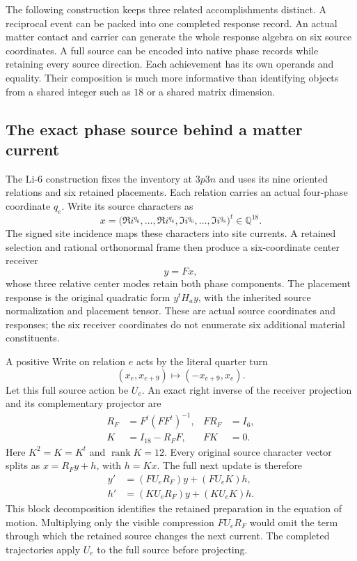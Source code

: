 The following construction keeps three related accomplishments distinct. A reciprocal event can be packed into one completed response record. An actual matter contact and carrier can generate the whole response algebra on six source coordinates. A full source can be encoded into native phase records while retaining every source direction. Each achievement has its own operands and equality. Their composition is much more informative than identifying objects from a shared integer such as $18$ or a shared matrix dimension.

\subsection{The exact phase source behind a matter current}

The Li-6 construction fixes the inventory at $3p3n$ and uses its nine oriented relations and six retained placements. Each relation carries an actual four-phase coordinate $q_e$. Write its source characters as
\begin{equation}
 x=\bigl(\Re i^{q_0},\ldots,\Re i^{q_8},
          \Im i^{q_0},\ldots,\Im i^{q_8}\bigr)^t\in\mathbb Q^{18}.
\end{equation}
The signed site incidence maps these characters into site currents. A retained selection and rational orthonormal frame then produce a six-coordinate center receiver
\begin{equation}
 y=Fx,
\end{equation}
whose three relative center modes retain both phase components. The placement response is the original quadratic form $y^tH_a y$, with the inherited source normalization and placement tensor. These are actual source coordinates and responses; the six receiver coordinates do not enumerate six additional material constituents.

A positive Write on relation $e$ acts by the literal quarter turn
\begin{equation}
 (x_e,x_{e+9})\longmapsto(-x_{e+9},x_e).
\end{equation}
Let this full source action be $U_e$. An exact right inverse of the receiver projection and its complementary projector are
\begin{align}
 R_F&=F^t(FF^t)^{-1}, & FR_F&=I_6,\\
 K&=I_{18}-R_FF, & FK&=0.
\end{align}
Here $K^2=K=K^t$ and $\operatorname{rank}K=12$. Every original source character vector splits as $x=R_Fy+h$, with $h=Kx$. The full next update is therefore
\begin{align}
 y'&=(FU_eR_F)y+(FU_eK)h,\\
 h'&=(KU_eR_F)y+(KU_eK)h.
\end{align}
This block decomposition identifies the retained preparation in the equation of motion. Multiplying only the visible compression $FU_eR_F$ would omit the term through which the retained source changes the next current. The completed trajectories apply $U_e$ to the full source before projecting.


